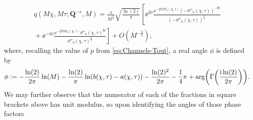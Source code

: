 \begin{multline}
q(M\chi,M\tau;\mathbf{Q}^{-s},M)=\frac{s}{M^\frac{1}{2}}\sqrt{\frac{\ln(2)}{\pi}}
\left[
\ee^{\ii\phi}
\frac{\ee^{-2\ii M\vartheta_a(\chi,\tau)}(-\vartheta''_a(\chi,\tau))^{-\ii p}}{(-\vartheta''_a(\chi,\tau))^\frac{1}{2}}\right.\\
\left.{}+\ee^{-\ii\phi}
\frac{\ee^{-2\ii M\vartheta_b(\chi,\tau)}\vartheta''_b(\chi,\tau)^{\ii p}}{\vartheta''_b(\chi,\tau)^\frac{1}{2}}\right]+O(M^{-\frac{3}{2}}),
\end{multline}
where, recalling the value of $p$ from \eqref{eq:Channels-Tout}, a real angle $\phi$ is defined by 
\begin{equation}
\phi\defeq -\frac{\ln(2)}{2\pi}\ln(M)-\frac{\ln(2)}{\pi}\ln(b(\chi,\tau)-a(\chi,\tau))-\frac{\ln(2)^2}{2\pi}-\frac{1}{4}\pi+\arg\left(\Gamma\left(\frac{\ii\ln(2)}{2\pi}\right)\right).
\label{eq:phi-def}
\end{equation}
We may further observe that the numerator of each of the fractions in square brackets above has unit modulus, so upon identifying the angles of those phase factors
